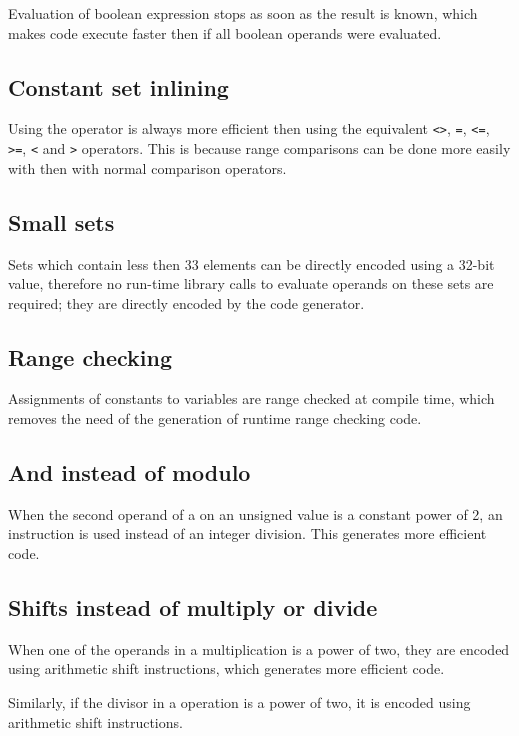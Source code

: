 {Evaluation of boolean expression stops as soon as the result is
known, which makes code execute faster then if all boolean operands
were evaluated.

\subsection{Constant set inlining}

Using the  operator is always more efficient then using the
equivalent \verb|<>|, \verb|=|, \verb|<=|, \verb|>=|, \verb|<| and \verb|>|
operators. This is because range comparisons can be done more easily with
 then with normal comparison operators.

\subsection{Small sets}

Sets which contain less then 33 elements can be directly encoded
using a 32-bit value, therefore no run-time library calls to
evaluate operands on these sets are required; they are directly encoded
by the code generator.

\subsection{Range checking}

Assignments of constants to variables are range checked at compile
time, which removes the need of the generation of runtime range checking
code.

\subsection{And instead of modulo}

When the second operand of a  on an unsigned value is a constant
power of 2, an  instruction is used instead of an integer division.
This generates more efficient code.

\subsection{Shifts instead of multiply or divide}

When one of the operands in a multiplication is a power of
two, they are encoded using arithmetic shift instructions,
which generates more efficient code.

Similarly, if the divisor in a  operation is a power
of two, it is encoded using arithmetic shift instructions.

}
